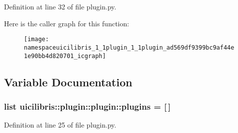\-Definition at line 32 of file plugin.\-py.



\-Here is the caller graph for this function\-:
\nopagebreak
\begin{figure}[H]
\begin{center}
\leavevmode
\texttt{[image: namespaceuicilibris\_1\_1plugin\_1\_1plugin\_ad569df9399bc9af44e1e90bb4d820701\_icgraph]}
\end{center}
\end{figure}




\subsection{\-Variable \-Documentation}
\hypertarget{namespaceuicilibris_1_1plugin_1_1plugin_a5e002ef1886525d06fa432911d943c74}{
\subsubsection[{plugins}]{\setlength{\rightskip}{0pt plus 5cm}list {\bf uicilibris\-::plugin\-::plugin\-::plugins} = \mbox{[}$\,$\mbox{]}}}\label{namespaceuicilibris_1_1plugin_1_1plugin_a5e002ef1886525d06fa432911d943c74}


\-Definition at line 25 of file plugin.\-py.

